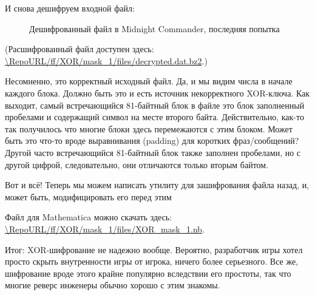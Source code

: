 И снова дешифруем входной файл:

\begin{figure}[H]
\centering
{}
\caption{Дешифрованный файл в Midnight Commander, последняя попытка}
\end{figure}

(Расшифрованный файл доступен здесь:
\url{\RepoURL/ff/XOR/mask_1/files/decrypted.dat.bz2}.)

Несомненно, это корректный исходный файл.
Да, и мы видим числа в начале каждого блока. Должно быть это и есть источник некорректного XOR-ключа.
Как выходит, самый встречающийся 81-байтный блок в файле это блок заполненный пробелами и содержащий символ  на месте
второго байта.
Действительно, как-то так получилось что многие блоки здесь перемежаются с этим блоком.
Может быть это что-то вроде выравнивания (padding) для коротких фраз/сообщений?
Другой часто встречающийся 81-байтный блок также заполнен пробелами, но с другой цифрой, следовательно,
они отличаются только вторым байтом.

Вот и всё! Теперь мы можем написать утилиту для зашифрования файла назад, и, может быть, модифицировать его перед этим

Файл для Mathematica можно скачать здесь:\\
\url{\RepoURL/ff/XOR/mask_1/files/XOR_mask_1.nb}.

Итог: XOR-шифрование не надежно вообще. Вероятно, разработчик игры хотел просто скрыть внутренности игры от игрока,
ничего более серьезного.
Все же, шифрование вроде этого крайне популярно вследствии его простоты, так что многие реверс инженеры обычно хорошо
с этим знакомы.

